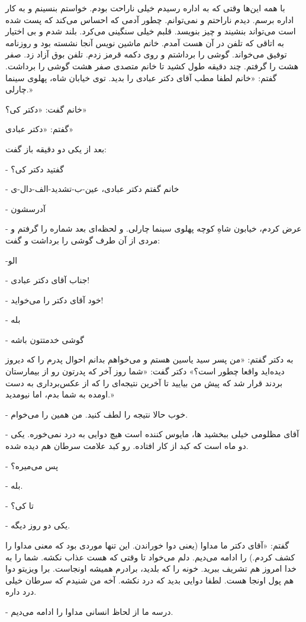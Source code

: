 \documentclass[12pt,a4paper]{book}
\begin{document}
با همه این‌ها وقتی که به اداره رسیدم خیلی ناراحت بودم. خواستم بنسینم و به کار اداره برسم. دیدم ناراحتم و نمی‌توانم. چطور آدمی که احساس می‌کند که پست شده است می‌تواند بنشیند و چیز بنویسد. قلبم خیلی سنگینی می‌کرد. بلند شدم و بی اختیار به اتاقی که تلفن در آن هست آمدم. خانم ماشین نویس آنجا  نشسته بود و روزنامه توفیق می‌خواند. گوشی را برداشتم و روی دکمه قرمز زدم. تلفن بوق آزاد زد. صفر هشت را گرفتم. چند دقیقه طول کشید تا خانم متصدی صفر هشت گوشی را برداشت. گفتم: «خانم لطفا مطب آقای دکتر عبادی را بدید. توی خیابان شاه، پهلوی سینما چارلی.»

خانم گفت: «دکتر کی؟»

گفتم: «دکتر عبادی»

بعد از یکی دو دقیقه باز گفت:

- گفتید دکتر کی؟

- خانم گفتم دکتر عبادی، عین-ب-تشدید-الف-دال-ی

- آدرسشون

- عرض کردم، خیابون شاهِ کوچه پهلوی سینما چارلی. و لحظه‌ای بعد شماره را گرفتم و مردی از آن طرف گوشی را برداشت و گفت:

-الو

- جناب آقای دکتر عبادی!

- خود آقای دکتر را می‌خواید!

- بله

- گوشی خدمتتون باشه

به دکتر گفتم: «من پسر سید یاسین هستم و می‌خواهم بدانم احوال پدرم را که دیروز دیده‌اید واقعا چطور است؟» دکتر گفت: «شما روز آخر که پدرتون رو از بیمارستان بردند قرار شد که پیش من بیایید تا آخرین نتیجه‌ای را که از عکس‌برداری به دست اومده به شما بدم، اما نیومدید.»

- خوب حالا نتیجه را لطف کنید. من همین را می‌خوام.

- آقای مظلومی خیلی ببخشید ها، مایوس کننده است هیچ دوایی به درد نمی‌خوره. یکی دو ماه است که کبد از کار افتاده. رو کبد علامت سرطان هم دیده شده.

- پس می‌میره؟

- بله.

- تا کی؟

- یکی دو روز دیگه.

گفتم: «آقای دکتر ما مداوا (یعنی دوا خوراندن. این تنها موردی بود که معنی مداوا را کشف کردم.) را ادامه می‌دیم. دلم می‌خواد تا وقتی که هست عذاب نکشه. شما را به خدا امروز هم تشریف ببرید. خونه را که بلدید، برادرم همیشه اونجاست. برا ویزیتو دوا هم پول اونجا هست. لطفا دوایی بدید که درد نکشه. آخه من شنیدم که سرطان خیلی درد داره.

- درسه ما از لحاظ انسانی مداوا را ادامه می‌دیم.
\end{document}
